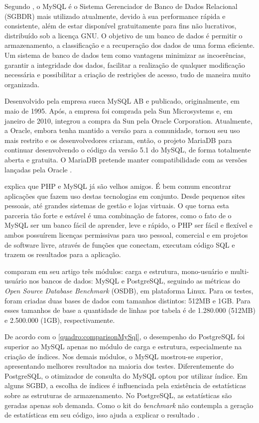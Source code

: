Segundo , o MySQL é o Sistema Gerenciador de Banco de Dados Relacional (SGBDR) mais utilizado atualmente, devido à sua performance rápida e consistente, além de estar disponível gratuitamente para fins não lucrativos, distribuído sob a licença GNU. O objetivo de um banco de dados é permitir o armazenamento, a classificação e a recuperação dos dados de uma forma eficiente. Um sistema de banco de dados tem como vantagens minimizar as incoerências, garantir a integridade dos dados, facilitar a realização de qualquer modificação necessária e possibilitar a criação de restrições de acesso, tudo de maneira muito organizada.

\newpage
Desenvolvido pela empresa sueca MySQL AB e publicado, originalmente, em maio de 1995. Após, a empresa foi comprada pela Sun Microsystems e, em janeiro de 2010, integrou a compra da Sun pela Oracle Corporation. Atualmente, a Oracle, embora tenha mantido a versão para a comunidade, tornou seu uso mais restrito e os desenvolvedores criaram, então, o projeto MariaDB para continuar desenvolvendo o código da versão 5.1 do MySQL, de forma totalmente aberta e gratuita. O MariaDB pretende manter compatibilidade com as versões lançadas pela Oracle \cite{mariadb}.

 explica que PHP e MySQL já são velhos amigos. É bem comum encontrar aplicações que fazem uso destas tecnologias em conjunto. Desde pequenos sites pessoais, até grandes sistemas de gestão e lojas virtuais. O que torna esta parceria tão forte e estável é uma combinação de fatores, como o fato de o MySQL ser um banco fácil de aprender, leve e rápido, o PHP ser fácil e flexível e ambos possuírem licenças permissivas para uso pessoal, comercial e em projetos de software livre, através de funções que conectam, executam código SQL e trazem os resultados para a aplicação.

 comparam em seu artigo três módulos: carga e estrutura, mono-usuário e multi-usuário nos bancos de dados: MySQL e PostgreSQL, seguindo as métricas do \textit{Open Source Database Benchmark} (OSDB), em plataforma Linux. Para os testes, foram criadas duas bases de dados com tamanhos distintos: 512MB e 1GB. Para esses tamanhos de base a quantidade de linhas por tabela é de 1.280.000 (512MB) e 2.500.000 (1GB), respectivamente.

De acordo com o \autoref{quadro:comparisonMySql}, o desempenho do PostgreSQL foi superior ao MySQL apenas no módulo de carga e estrutura, especialmente na criação de índices. Nos demais módulos, o MySQL mostrou-se superior, apresentando melhores resultados na maioria dos testes. Diferentemente do PostgreSQL, o otimizador de consulta do MySQL optou por utilizar índice. Em alguns SGBD, a escolha de índices é influenciada pela existência de estatísticas sobre as estruturas de armazenamento. No PostgreSQL, as estatísticas são geradas apenas sob demanda. Como o kit do \textit{benchmark} não contempla a geração de estatísticas em seu código, isso ajuda a explicar o resultado \cite{mysql:ufpe}.

